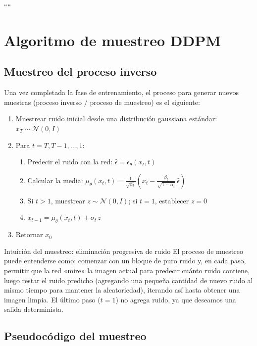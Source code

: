 \documentclass[a4paper]{article}
\begin{document}


````
\section{Algoritmo de muestreo DDPM}

\subsection{Muestreo del proceso inverso}

Una vez completada la fase de entrenamiento, el proceso para generar nuevos muestras (proceso inverso / proceso de muestreo) es el siguiente:

\begin{enumerate}
    \item Muestrear ruido inicial desde una distribución gaussiana estándar: $x_T \sim \mathcal{N}(0, I)$
    \item Para $t = T, T-1, \dots, 1$:
    \begin{enumerate}
        \item Predecir el ruido con la red: $\hat{\epsilon} = \epsilon_\theta(x_t, t)$
        \item Calcular la media: $\mu_\theta(x_t, t) = \frac{1}{\sqrt{\alpha_t}}\left(x_t - \frac{\beta_t}{\sqrt{1-\bar{\alpha}_t}}\, \hat{\epsilon}\right)$
        \item Si $t > 1$, muestrear $z \sim \mathcal{N}(0, I)$; si $t = 1$, establecer $z = 0$
        \item $x_{t-1} = \mu_\theta(x_t, t) + \sigma_t\, z$
    \end{enumerate}
    \item Retornar $x_0$
\end{enumerate}

\begin{importantbox}{Intuición del muestreo: eliminación progresiva de ruido}
El proceso de muestreo puede entenderse como: comenzar con un bloque de puro ruido y, en cada paso, permitir que la red «mire» la imagen actual para predecir cuánto ruido contiene, luego restar el ruido predicho (agregando una pequeña cantidad de nuevo ruido al mismo tiempo para mantener la aleatoriedad), iterando así hasta obtener una imagen limpia. El último paso ($t=1$) no agrega ruido, ya que deseamos una salida determinista.
\end{importantbox}

\subsection{Pseudocódigo del muestreo}
\end{document}
